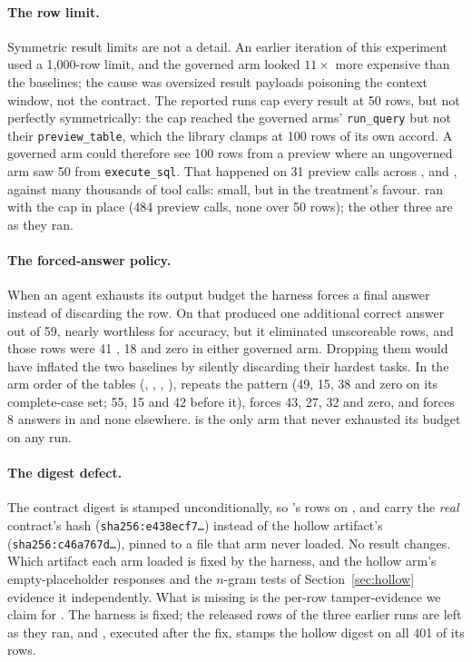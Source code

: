 \paragraph{The row limit.} Symmetric result limits are not a detail. An
earlier iteration of this experiment used a 1{,}000-row limit, and the
governed arm looked $11{\times}$ more expensive than the baselines; the cause
was oversized result payloads poisoning the context window, not the
contract. The reported runs cap every result at 50 rows, but not perfectly
symmetrically: the cap reached the governed arms' \texttt{run\_query} but
not their \texttt{preview\_table}, which the library clamps at 100 rows of
its own accord. A governed arm could therefore see 100 rows from a preview
where an ungoverned arm saw 50 from \texttt{execute\_sql}. That happened on
31 preview calls across \mGLM{}, \mDS{} and \mGPT{}, against many thousands
of tool calls: small, but in the treatment's favour. \mSON{} ran with the
cap in place (484 preview calls, none over 50 rows); the other three are as
they ran.

\paragraph{The forced-answer policy.} When an agent exhausts its output
budget the harness forces a final answer instead of discarding the row. On
\mGLM{} that produced one additional correct answer out of 59, nearly
worthless for accuracy, but it eliminated unscoreable rows, and those rows
were 41 \armS{}, 18 \armM{} and zero in either governed arm. Dropping them
would have inflated the two baselines by silently discarding their hardest
tasks. In the arm order of the tables (\armS{}, \armH{}, \armM{}, \armC{}), \mDS{}
repeats the pattern (49, 15, 38 and zero on its complete-case set; 55, 15
and 42 before it), \mSON{} forces 43, 27, 32 and zero, and \mGPT{} forces 8
answers in \armH{} and none elsewhere. \armC{} is the only arm
that never exhausted its budget on any run.

\paragraph{The digest defect.} The contract digest is stamped
unconditionally, so \armH{}'s rows on \mGLM{}, \mDS{} and \mGPT{} carry the
\emph{real} contract's hash (\texttt{sha256:e438ecf7\ldots}) instead of the
hollow artifact's (\texttt{sha256:c46a767d\ldots}), pinned to a file that arm
never loaded. No result changes. Which artifact each arm loaded is fixed by
the harness, and the hollow arm's empty-placeholder responses and the
$n$-gram tests of Section~\ref{sec:hollow} evidence it independently. What is
missing is the per-row tamper-evidence we claim for \armH{}. The harness is
fixed; the released rows of the three earlier runs are left as they ran, and
\mSON{}, executed after the fix, stamps the hollow digest on all 401 of its
\armH{} rows.

